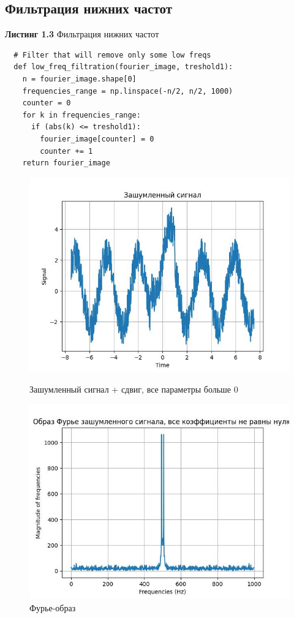        \newpage 
   \subsection{Фильтрация нижних частот}
   \noindent \textbf{Листинг 1.3} Фильтрация нижних частот
        \begin{lstlisting}
  # Filter that will remove only some low freqs
  def low_freq_filtration(fourier_image, treshold1):
    n = fourier_image.shape[0]
    frequencies_range = np.linspace(-n/2, n/2, 1000)
    counter = 0
    for k in frequencies_range:
      if (abs(k) <= treshold1):
        fourier_image[counter] = 0
        counter += 1
    return fourier_image
        \end{lstlisting}
   \begin{figure}[!htb]
      \includegraphics[width=\linewidth]{../images/result/original_s5.jpeg}
      \caption{Зашумленный сигнал + сдвиг, все параметры больше 0}
    \endminipage\hfill
      \includegraphics[width=\linewidth]{../images/result/original_s5_fourier.jpeg}
      \caption{Фурье-образ}
    \endminipage\hfill
    \end{figure}
